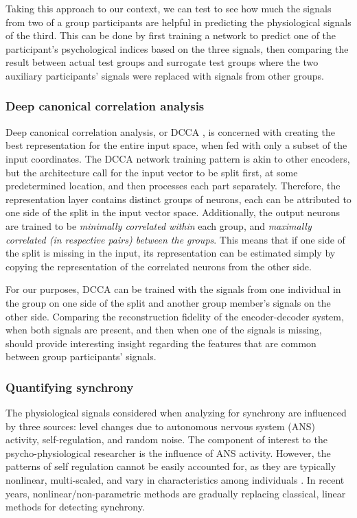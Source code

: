 \documentclass[a4paper, 11pt]{report}      %
\begin{document}
Taking this approach to our context, we can test to see how much the signals from two of a group participants are helpful in predicting the physiological signals of the third. This can be done by first training a network to predict one of the participant's psychological indices based on the three signals, then comparing the result between actual test groups and surrogate test groups where the two auxiliary participants' signals were replaced with signals from other groups.


\subsubsection{Deep canonical correlation analysis}
Deep canonical correlation analysis, or DCCA  \citep{andrew2013deep}, is concerned with creating the best representation for the entire input space, when fed with only a subset of the input coordinates. The DCCA network training pattern is akin to other encoders, but the architecture call for the input vector to be split first, at some predetermined location, and then processes each part separately. Therefore, the representation layer contains distinct groups of neurons, each can be attributed to one side of the split in the input vector space. Additionally, the output neurons are trained to be \emph{minimally correlated within} each group, and \emph{maximally correlated (in respective pairs) between the groups}. This means that if one side of the split is missing in the input, its representation can be estimated simply by copying the representation of the correlated neurons from the other side.

For our purposes, DCCA can be trained with the signals from one individual in the group on one side of the split and another group member's signals on the other side. Comparing the reconstruction fidelity of the encoder-decoder system, when both signals are present, and then when one of the signals is missing, should provide interesting insight regarding the features that are common between group participants' signals.


\subsubsection{Quantifying synchrony}
The physiological signals considered when analyzing for synchrony are influenced by three sources: level changes due to autonomous nervous system (ANS) activity, self-regulation, and random noise. The component of interest to the psycho-physiological researcher is the influence of ANS activity. However, the patterns of self regulation cannot be easily accounted for, as they are typically nonlinear, multi-scaled, and vary in characteristics among individuals \citep{ivanov20011}. In recent years, 
nonlinear/non-parametric methods are gradually replacing classical, linear methods for detecting synchrony.
\end{document}
